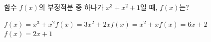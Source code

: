 함수 $f(x)$의 부정적분 중 하나가 $x^3+x^2+1$일 때, $f(x)$는?
\begin{choicesii}{$f(x)=x^3+x^2$}{$f(x)=3x^2+2x$}{$f(x)=x^2+x$}{$f(x)=6x+2$}{$f(x)=2x+1$}\end{choicesii}
